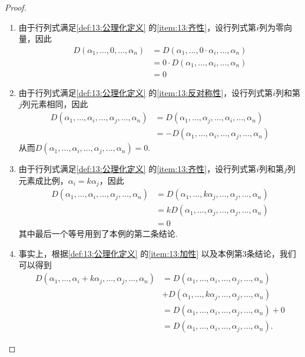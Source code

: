 \begin{proof}
    \begin{enumerate}
        \item 由于行列式满足\autoref{def:13:公理化定义} 的\ref*{item:13:齐性}，设行列式第$i$列为零向量，因此
              \begin{align*}
                  D(\alpha_1,\ldots,0,\ldots,\alpha_n) & =D(\alpha_1,\ldots,0\cdot\alpha_i,\ldots,\alpha_n)  \\
                                                       & =0\cdot D(\alpha_1,\ldots,\alpha_i,\ldots,\alpha_n) \\
                                                       & =0
              \end{align*}

        \item 由于行列式满足\autoref{def:13:公理化定义} 的\ref*{item:13:反对称性}，设行列式第$i$列和第$j$列元素相同，因此
              \begin{align*}
                  D(\alpha_1,\ldots,\alpha_i,\ldots,\alpha_j,\ldots,\alpha_n) & =D(\alpha_1,\ldots,\alpha_j,\ldots,\alpha_i,\ldots,\alpha_n)  \\
                                                                              & =-D(\alpha_1,\ldots,\alpha_i,\ldots,\alpha_j,\ldots,\alpha_n)
              \end{align*}
              从而$D(\alpha_1,\ldots,\alpha_i,\ldots,\alpha_j,\ldots,\alpha_n)=0$.

        \item 由于行列式满足\autoref{def:13:公理化定义} 的\ref*{item:13:齐性}，设行列式第$i$列和第$j$列元素成比例，$\alpha_i=k\alpha_j$，因此
              \begin{align*}
                  D(\alpha_1,\ldots,\alpha_i,\ldots,\alpha_j,\ldots,\alpha_n)
                   & =D(\alpha_1,\ldots,k\alpha_j,\ldots,\alpha_j,\ldots,\alpha_n) \\
                   & =kD(\alpha_1,\ldots,\alpha_j,\ldots,\alpha_j,\ldots,\alpha_n) \\
                   & =0
              \end{align*}
              其中最后一个等号用到了本例的第二条结论.

        \item 事实上，根据\autoref{def:13:公理化定义} 的\ref*{item:13:加性} 以及本例第3条结论，我们可以得到
              \begin{align*}
                  D(\alpha_1,\ldots,\alpha_i+k\alpha_j,\ldots,\alpha_j,\ldots,\alpha_n)
                   & =D(\alpha_1,\ldots,\alpha_i,\ldots,\alpha_j,\ldots,\alpha_n)   \\&+D(\alpha_1,\ldots,k\alpha_j,\ldots,\alpha_j,\ldots,\alpha_n) \\
                   & =D(\alpha_1,\ldots,\alpha_i,\ldots,\alpha_j,\ldots,\alpha_n)+0 \\
                   & =D(\alpha_1,\ldots,\alpha_i,\ldots,\alpha_j,\ldots,\alpha_n).
              \end{align*}


\end{enumerate}
\end{proof}
